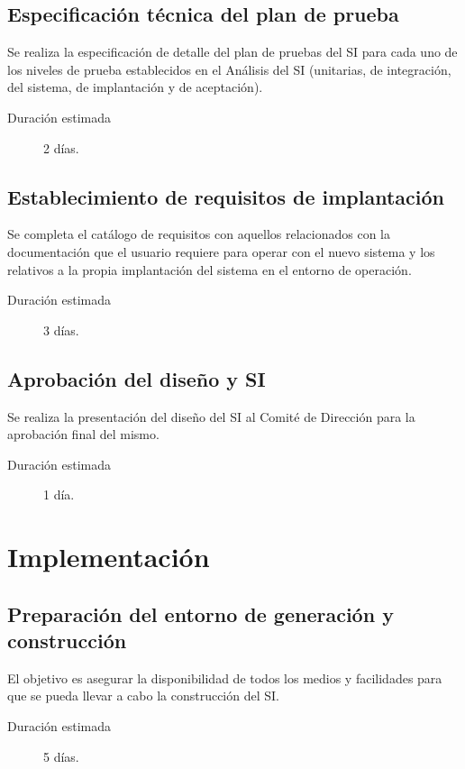 \documentclass[11pt,a4paper,spanish,twoside]{report}
\begin{document}
\subsection{Especificación técnica del plan de prueba}
Se realiza la especificación de detalle del plan de pruebas del SI para cada
uno de los niveles de prueba establecidos en el Análisis del SI (unitarias,
de integración, del sistema, de implantación y de aceptación). 
\begin{description}
\item[Duración estimada] 2 días.
\end{description}

\subsection{Establecimiento de requisitos de implantación}
Se completa el catálogo de requisitos con aquellos relacionados con la
documentación que el usuario requiere para operar con el nuevo sistema y los
relativos a la propia implantación del sistema en el entorno de operación. 
\begin{description}
\item[Duración estimada] 3 días.
\end{description}

\subsection{Aprobación del diseño y SI}
Se realiza la presentación del diseño del SI al Comité de Dirección para la
aprobación final del mismo. 
\begin{description}
\item[Duración estimada] 1 día.
\end{description}

\section{Implementación}
\subsection{Preparación del entorno de generación y construcción}
El objetivo es asegurar la disponibilidad de todos los medios y facilidades
para que se pueda llevar a cabo la construcción del SI. 
\begin{description}
\item[Duración estimada] 5 días.
\end{description}
\end{document}
